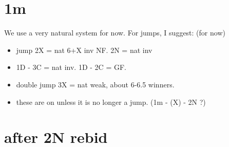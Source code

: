 \section{1m}

We use a very natural system for now. For jumps, I suggest: (for now)
\begin{itemize}
    \setlength\itemsep{0pt}
    \item jump 2X = nat 6+X inv NF. 2N = nat inv
    \item 1D - 3C = nat inv. 1D - 2C = GF.
    \item double jump 3X = nat weak, about 6-6.5 winners.
    \item these are on unless it is no longer a jump. (1m - (X) - 2N ?)
\end{itemize}


\section{after 2N rebid}

